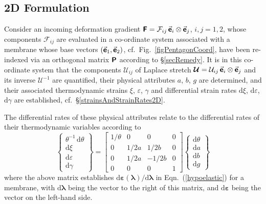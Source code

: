 \subsection{2D Formulation}

Consider an incoming deformation gradient $\boldsymbol{\mathsf{F}} = \mathcal{F}_{ij} \, \vec{\boldsymbol{\mathsf{e}}}_i \otimes \vec{\boldsymbol{\mathsf{e}}}_j$, $i, j = 1, 2$, whose components $\mathcal{F}_{ij}$ are evaluated in a co-ordinate system associated with a membrane whose base vectors $( \vec{\boldsymbol{\mathsf{e}}}_1 , \vec{\boldsymbol{\mathsf{e}}}_2 )$, cf.\ Fig.~\ref{figPentagonCoord}, have been re-indexed via an orthogonal matrix $\boldsymbol{\mathsf{P}}$ according to \S\ref{secRemedy}.  It is in this co-ordinate system that the components $\mathcal{U}_{ij}$ of Laplace stretch $\boldsymbol{\mathcal{U}} = \mathcal{U}_{ij} \, \vec{\boldsymbol{\mathsf{e}}}_i \otimes \vec{\boldsymbol{\mathsf{e}}}_j$ and its inverse $\boldsymbol{\mathcal{U}}^{-1}$ are quantified, their physical attributes $a$, $b$, $g$ are determined, and their associated thermo\-dynamic strains $\xi$, $\varepsilon$, $\gamma$ and differential strain rates $\mathrm{d} \xi$, $\mathrm{d} \varepsilon$, $\mathrm{d} \gamma$ are established, cf.\ \S\ref{strainsAndStrainRates2D}.

The differential rates of these physical attributes relate to the differential rates of their thermo\-dynamic variables according to 
\begin{equation}
    \left\{ \begin{matrix}
    \theta^{-1} \, \mathrm{d} \theta \\ \mathrm{d} \xi \\
    \mathrm{d} \varepsilon \\ \mathrm{d} \gamma
    \end{matrix} \right\} = \begin{bmatrix}
    1 / \theta & 0 & 0 & 0 \\
    0 & 1/2a & 1/2b & 0 \\
    0 & 1/2a & -1/2b & 0 \\
    0 & 0 & 0 & 1
    \end{bmatrix} \left\{ \begin{matrix} 
    \mathrm{d} \theta \\ \mathrm{d} a \\
    \mathrm{d} b \\ \mathrm{d} g
    \end{matrix} \right\}
\end{equation}
where the above matrix establishes $\mathrm{d} \boldsymbol{\varepsilon} ( \boldsymbol{\lambda} ) / \mathrm{d} \boldsymbol{\lambda}$ in Eqn.~(\ref{hypoelastic}) for a membrane, with $\mathrm{d} \boldsymbol{\lambda}$ being the vector to the right of this matrix, and $\mathrm{d} \boldsymbol{\varepsilon}$ being the vector on the left-hand side.

